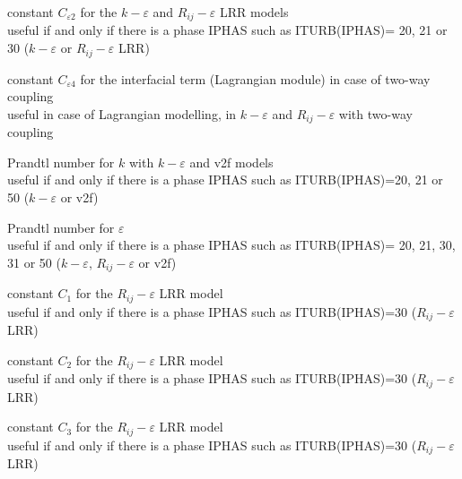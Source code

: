 {constant $C_{\varepsilon 2}$ for the $k-\varepsilon$ and
$R_{ij}-\varepsilon$ LRR models\\
useful if and only if there is a phase IPHAS such as ITURB(IPHAS)= 20, 21 or 30
($k-\varepsilon$ or $R_{ij}-\varepsilon$ LRR)}


{constant $C_{\varepsilon 4}$ for the interfacial term (Lagrangian module) in
case of two-way coupling\\
useful in case of Lagrangian modelling, in $k-\varepsilon$ and $R_{ij}-\varepsilon$
with two-way coupling} 

{Prandtl number for $k$ with $k-\varepsilon$ and v2f models\\
useful if and only if there is a phase IPHAS such as ITURB(IPHAS)=20, 21 or 50
($k-\varepsilon$ or v2f)}

{Prandtl number for $\varepsilon$\\
useful if and only if there is a phase IPHAS such as ITURB(IPHAS)= 20,
21, 30, 31 or 50 ($k-\varepsilon$, $R_{ij}-\varepsilon$ or v2f)}


{constant $C_1$ for the $R_{ij}-\varepsilon$ LRR model\\
useful if and only if there is a phase IPHAS such as ITURB(IPHAS)=30
($R_{ij}-\varepsilon$ LRR)}

{constant $C_2$ for the $R_{ij}-\varepsilon$ LRR model\\
useful if and only if there is a phase IPHAS such as ITURB(IPHAS)=30
($R_{ij}-\varepsilon$ LRR)}

{constant $C_3$ for the $R_{ij}-\varepsilon$ LRR model\\
useful if and only if there is a phase IPHAS such as ITURB(IPHAS)=30
($R_{ij}-\varepsilon$ LRR)}

